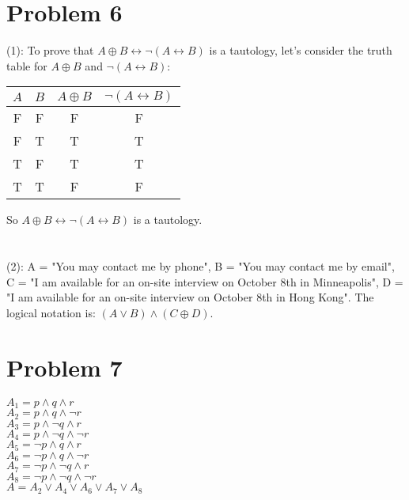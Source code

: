 \documentclass{article}
\begin{document}
\section{Problem 6}
(1): To prove that $A \oplus B \leftrightarrow \neg (A \leftrightarrow B)$ is a tautology, let's consider the truth table for $A \oplus B$ and $\neg (A \leftrightarrow B)$:\\
\begin{table}[H]
\centering
\begin{tabular}{|c|c|c|c|}
\hline
$A$ & $B$ & $A \oplus B$ & $\neg (A \leftrightarrow B)$\\
\hline
F & F & F & F\\
F & T & T & T\\
T & F & T & T\\
T & T & F & F\\
\hline
\end{tabular}
\end{table}
So $A \oplus B \leftrightarrow \neg (A \leftrightarrow B)$ is a tautology.\\
\\ \hspace*{\fill} \\
(2): A = "You may contact me by phone", B = "You may contact me by email", C = "I am available for an on-site interview on October 8th in Minneapolis", D = "I am available for an on-site interview on October 8th in Hong Kong". The logical notation is: $(A \vee B) \wedge (C \oplus D)$.\\
\section{Problem 7}
$A_1 = p \wedge q \wedge r$\\
$A_2 = p \wedge q \wedge \neg r$\\
$A_3 = p \wedge \neg q \wedge r$\\
$A_4 = p \wedge \neg q \wedge \neg r$\\
$A_5 = \neg p \wedge q \wedge r$\\
$A_6 = \neg p \wedge q \wedge \neg r$\\
$A_7 = \neg p \wedge \neg q \wedge r$\\
$A_8 = \neg p \wedge \neg q \wedge \neg r$\\
$A = A_2 \vee A_4 \vee A_6 \vee A_7 \vee A_8$\\
\end{document}
